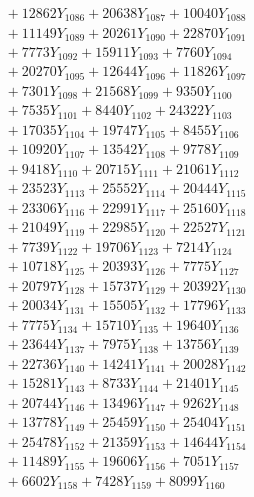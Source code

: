 \documentclass[a4paper,10pt]{article}
\begin{document}
{\begin{align}
&\;  + 12862 Y_{1086} + 20638 Y_{1087} + 10040 Y_{1088} \\[0.3ex]
&\;  + 11149 Y_{1089} + 20261 Y_{1090} + 22870 Y_{1091} \\[0.3ex]
&\;  + 7773 Y_{1092} + 15911 Y_{1093} + 7760 Y_{1094} \\[0.3ex]
&\;  + 20270 Y_{1095} + 12644 Y_{1096} + 11826 Y_{1097} \\[0.3ex]
&\;  + 7301 Y_{1098} + 21568 Y_{1099} + 9350 Y_{1100} \\[0.3ex]
&\;  + 7535 Y_{1101} + 8440 Y_{1102} + 24322 Y_{1103} \\[0.3ex]
&\;  + 17035 Y_{1104} + 19747 Y_{1105} + 8455 Y_{1106} \\[0.3ex]
&\;  + 10920 Y_{1107} + 13542 Y_{1108} + 9778 Y_{1109} \\[0.5ex]\allowbreak
&\;  + 9418 Y_{1110} + 20715 Y_{1111} + 21061 Y_{1112} \\[0.3ex]
&\;  + 23523 Y_{1113} + 25552 Y_{1114} + 20444 Y_{1115} \\[0.3ex]
&\;  + 23306 Y_{1116} + 22991 Y_{1117} + 25160 Y_{1118} \\[0.3ex]
&\;  + 21049 Y_{1119} + 22985 Y_{1120} + 22527 Y_{1121} \\[0.3ex]
&\;  + 7739 Y_{1122} + 19706 Y_{1123} + 7214 Y_{1124} \\[0.3ex]
&\;  + 10718 Y_{1125} + 20393 Y_{1126} + 7775 Y_{1127} \\[0.3ex]
&\;  + 20797 Y_{1128} + 15737 Y_{1129} + 20392 Y_{1130} \\[0.3ex]
&\;  + 20034 Y_{1131} + 15505 Y_{1132} + 17796 Y_{1133} \\[0.3ex]
&\;  + 7775 Y_{1134} + 15710 Y_{1135} + 19640 Y_{1136} \\[0.3ex]
&\;  + 23644 Y_{1137} + 7975 Y_{1138} + 13756 Y_{1139} \\[0.5ex]\allowbreak
&\;  + 22736 Y_{1140} + 14241 Y_{1141} + 20028 Y_{1142} \\[0.3ex]
&\;  + 15281 Y_{1143} + 8733 Y_{1144} + 21401 Y_{1145} \\[0.3ex]
&\;  + 20744 Y_{1146} + 13496 Y_{1147} + 9262 Y_{1148} \\[0.3ex]
&\;  + 13778 Y_{1149} + 25459 Y_{1150} + 25404 Y_{1151} \\[0.3ex]
&\;  + 25478 Y_{1152} + 21359 Y_{1153} + 14644 Y_{1154} \\[0.3ex]
&\;  + 11489 Y_{1155} + 19606 Y_{1156} + 7051 Y_{1157} \\[0.3ex]
&\;  + 6602 Y_{1158} + 7428 Y_{1159} + 8099 Y_{1160} \\[0.3ex]

\end{align}}
\end{document}
